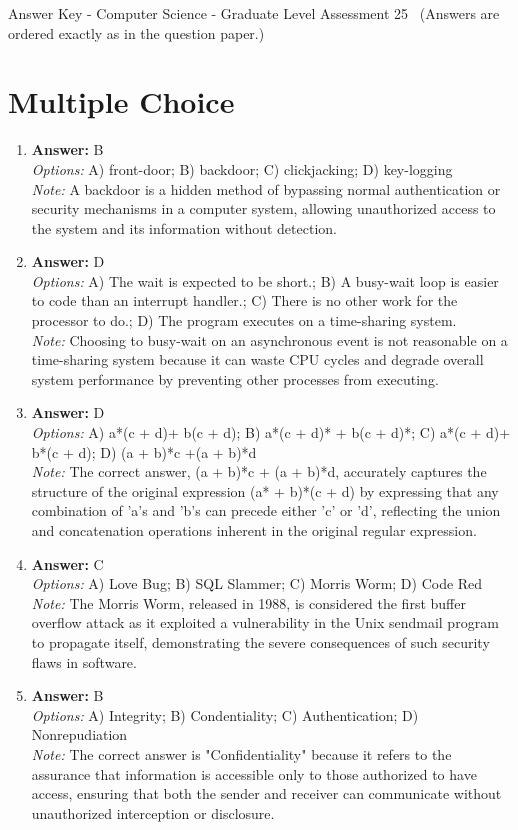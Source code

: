 \documentclass[12pt]{article}
\begin{document}
\begin{center}
Answer Key - Computer Science - Graduate Level Assessment 25 \
\small (Answers are ordered exactly as in the question paper.)
\end{center}

\section*{Multiple Choice}
\begin{enumerate}[label=\arabic*.]
\item \textbf{Answer:} B
\\ \textit{Options:} A) front-door; B) backdoor; C) clickjacking; D) key-logging
\\ \textit{Note:} A backdoor is a hidden method of bypassing normal authentication or security mechanisms in a computer system, allowing unauthorized access to the system and its information without detection.
\item \textbf{Answer:} D
\\ \textit{Options:} A) The wait is expected to be short.; B) A busy-wait loop is easier to code than an interrupt handler.; C) There is no other work for the processor to do.; D) The program executes on a time-sharing system.
\\ \textit{Note:} Choosing to busy-wait on an asynchronous event is not reasonable on a time-sharing system because it can waste CPU cycles and degrade overall system performance by preventing other processes from executing.
\item \textbf{Answer:} D
\\ \textit{Options:} A) a*(c + d)+ b(c + d); B) a*(c + d)* + b(c + d)*; C) a*(c + d)+ b*(c + d); D) (a + b)*c +(a + b)*d
\\ \textit{Note:} The correct answer, (a + b)*c + (a + b)*d, accurately captures the structure of the original expression (a* + b)*(c + d) by expressing that any combination of 'a's and 'b's can precede either 'c' or 'd', reflecting the union and concatenation operations inherent in the original regular expression.
\item \textbf{Answer:} C
\\ \textit{Options:} A) Love Bug; B) SQL Slammer; C) Morris Worm; D) Code Red
\\ \textit{Note:} The Morris Worm, released in 1988, is considered the first buffer overflow attack as it exploited a vulnerability in the Unix sendmail program to propagate itself, demonstrating the severe consequences of such security flaws in software.
\item \textbf{Answer:} B
\\ \textit{Options:} A) Integrity; B) Condentiality; C) Authentication; D) Nonrepudiation
\\ \textit{Note:} The correct answer is "Confidentiality" because it refers to the assurance that information is accessible only to those authorized to have access, ensuring that both the sender and receiver can communicate without unauthorized interception or disclosure.
\end{enumerate}
\end{document}

